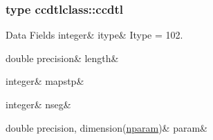 \subsubsection{type ccdtlclass\+::ccdtl}
\begin{DoxyFields}{Data Fields}
\mbox{\label{namespaceccdtlclass_aea542f9975283b5fd43c8f15a0d2762f}} 
integer&
itype&
Itype = 102. \\
\hline

\mbox{\label{namespaceccdtlclass_a367acb3cd3326d78cf47fe5c8891b80c}} 
double precision&
length&
\\
\hline

\mbox{\label{namespaceccdtlclass_a646c337f17e8c188638d58449ea92b99}} 
integer&
mapstp&
\\
\hline

\mbox{\label{namespaceccdtlclass_a56759205b010998a69c2716e35e0d6d6}} 
integer&
nseg&
\\
\hline

\mbox{\label{namespaceccdtlclass_a6b125e6ca6440736ab2272ad373cc24d}} 
double precision, dimension(\mbox{\hyperlink{namespaceccdtlclass_a0e8e95c86f2dab6639fc79f05859b6ea}{nparam}})&
param&
\\
\hline

\end{DoxyFields}
